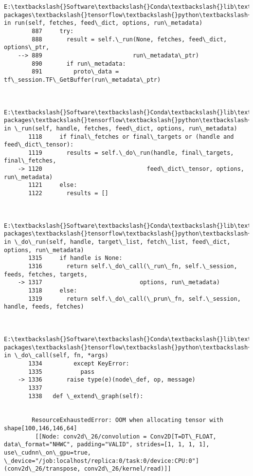 \documentclass[11pt]{article}
\begin{document}
\begin{Verbatim}[commandchars=\\\{\}]
        E:\textbackslash{}Software\textbackslash{}Conda\textbackslash{}lib\textbackslash{}site-packages\textbackslash{}tensorflow\textbackslash{}python\textbackslash{}client\textbackslash{}session.py in run(self, fetches, feed\_dict, options, run\_metadata)
        887     try:
        888       result = self.\_run(None, fetches, feed\_dict, options\_ptr,
    --> 889                          run\_metadata\_ptr)
        890       if run\_metadata:
        891         proto\_data = tf\_session.TF\_GetBuffer(run\_metadata\_ptr)
    

        E:\textbackslash{}Software\textbackslash{}Conda\textbackslash{}lib\textbackslash{}site-packages\textbackslash{}tensorflow\textbackslash{}python\textbackslash{}client\textbackslash{}session.py in \_run(self, handle, fetches, feed\_dict, options, run\_metadata)
       1118     if final\_fetches or final\_targets or (handle and feed\_dict\_tensor):
       1119       results = self.\_do\_run(handle, final\_targets, final\_fetches,
    -> 1120                              feed\_dict\_tensor, options, run\_metadata)
       1121     else:
       1122       results = []
    

        E:\textbackslash{}Software\textbackslash{}Conda\textbackslash{}lib\textbackslash{}site-packages\textbackslash{}tensorflow\textbackslash{}python\textbackslash{}client\textbackslash{}session.py in \_do\_run(self, handle, target\_list, fetch\_list, feed\_dict, options, run\_metadata)
       1315     if handle is None:
       1316       return self.\_do\_call(\_run\_fn, self.\_session, feeds, fetches, targets,
    -> 1317                            options, run\_metadata)
       1318     else:
       1319       return self.\_do\_call(\_prun\_fn, self.\_session, handle, feeds, fetches)
    

        E:\textbackslash{}Software\textbackslash{}Conda\textbackslash{}lib\textbackslash{}site-packages\textbackslash{}tensorflow\textbackslash{}python\textbackslash{}client\textbackslash{}session.py in \_do\_call(self, fn, *args)
       1334         except KeyError:
       1335           pass
    -> 1336       raise type(e)(node\_def, op, message)
       1337 
       1338   def \_extend\_graph(self):
    

        ResourceExhaustedError: OOM when allocating tensor with shape[100,146,146,64]
    	 [[Node: conv2d\_26/convolution = Conv2D[T=DT\_FLOAT, data\_format="NHWC", padding="VALID", strides=[1, 1, 1, 1], use\_cudnn\_on\_gpu=true, \_device="/job:localhost/replica:0/task:0/device:CPU:0"](conv2d\_26/transpose, conv2d\_26/kernel/read)]]
    

\end{Verbatim}
\end{document}
